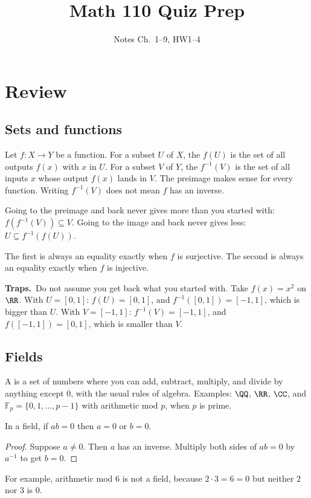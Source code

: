 \documentclass[11pt]{scrartcl}
\title{Math 110 Quiz Prep}
\subtitle{Notes Ch.~1--9, HW1--4}
\author{}
\date{}
\newcommand{\Fp}{\mathbb F_p}
\newcommand{\traps}{\par\medskip\noindent\textbf{\color{RawSienna}Traps.}\ }
\begin{document}
\maketitle

\section{Review}

\subsection{Sets and functions}
Let $f\colon X\to Y$ be a function.
For a subset $U$ of $X$, the  $f(U)$ is the set of all outputs $f(x)$ with $x$ in $U$.
For a subset $V$ of $Y$, the  $f^{-1}(V)$ is the set of all inputs $x$ whose output $f(x)$ lands in $V$.
The preimage makes sense for every function. Writing $f^{-1}(V)$ does not mean $f$ has an inverse.

\begin{proposition*}[HW1 P1]
  Going to the preimage and back never gives more than you started with: $f(f^{-1}(V))\subseteq V$.
  Going to the image and back never gives less: $U\subseteq f^{-1}(f(U))$.
  \begin{itemize}
    \ii The first is always an equality exactly when $f$ is surjective.
    \ii The second is always an equality exactly when $f$ is injective.
  \end{itemize}
\end{proposition*}

\traps Do not assume you get back what you started with. Take $f(x)=x^2$ on $\RR$.
With $U=[0,1]$: $f(U)=[0,1]$, and $f^{-1}([0,1])=[-1,1]$, which is bigger than $U$.
With $V=[-1,1]$: $f^{-1}(V)=[-1,1]$, and $f([-1,1])=[0,1]$, which is smaller than $V$.

\subsection{Fields}
A  is a set of numbers where you can add, subtract, multiply, and divide by anything except $0$, with the usual rules of algebra.
Examples: $\QQ$, $\RR$, $\CC$, and $\Fp=\{0,1,\dots,p-1\}$ with arithmetic mod $p$, when $p$ is prime.

\begin{proposition*}[HW1 P3]
  In a field, if $ab=0$ then $a=0$ or $b=0$.
\end{proposition*}
\begin{proof}
  Suppose $a\ne0$. Then $a$ has an inverse. Multiply both sides of $ab=0$ by $a^{-1}$ to get $b=0$.
\end{proof}
For example, arithmetic mod $6$ is not a field, because $2\cdot3=6=0$ but neither $2$ nor $3$ is $0$.
\end{document}
